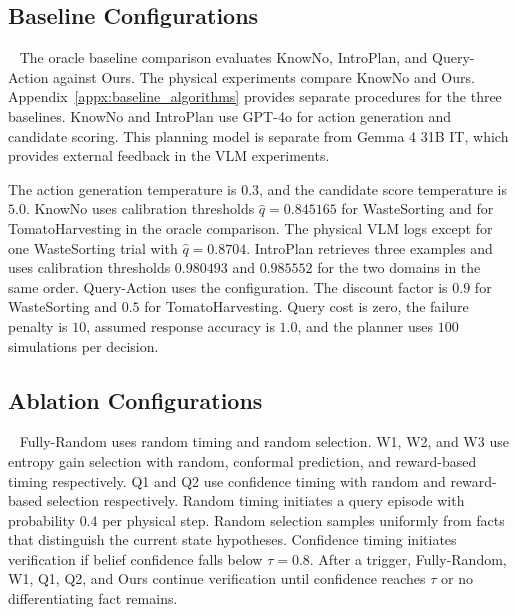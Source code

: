 
\subsection{Baseline Configurations}~\label{appx:baseline_configs}
The oracle baseline comparison evaluates KnowNo, IntroPlan, and Query-Action against Ours. The physical experiments compare KnowNo and Ours. Appendix~\ref{appx:baseline_algorithms} provides separate procedures for the three baselines. KnowNo and IntroPlan use GPT-4o for action generation and candidate scoring. This planning model is separate from Gemma 4 31B IT, which provides external feedback in the VLM experiments.

The  action generation temperature is $0.3$, and the candidate score temperature is $5.0$.  KnowNo uses calibration thresholds $\hat{q}=0.845165$ for WasteSorting and  for TomatoHarvesting in the oracle comparison. The physical VLM logs  except for one WasteSorting trial with $\hat{q}=0.8704$. IntroPlan retrieves three examples and uses calibration thresholds $0.980493$ and $0.985552$ for the two domains in the same order. Query-Action uses the  configuration. The discount factor is $0.9$ for WasteSorting and $0.5$ for TomatoHarvesting. Query cost is zero, the failure penalty is $10$, assumed response accuracy is $1.0$, and the planner uses $100$ simulations per decision.

\subsection{Ablation Configurations}~\label{appx:ablation_configs}
Fully-Random uses random timing and random selection. W1, W2, and W3 use entropy gain selection with random, conformal prediction, and reward-based timing respectively. Q1 and Q2 use confidence timing with random and reward-based selection respectively. Random timing initiates a query episode with probability $0.4$ per physical step. Random selection samples uniformly from facts that distinguish the current state hypotheses. Confidence timing initiates verification if belief confidence falls below $\tau=0.8$. After a trigger, Fully-Random, W1, Q1, Q2, and Ours continue verification until confidence reaches $\tau$ or no differentiating fact remains.


